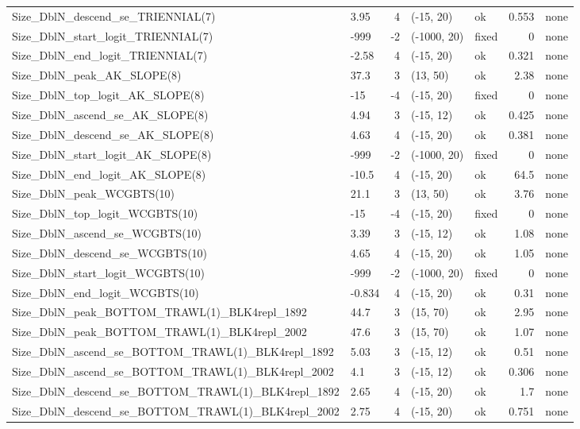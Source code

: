 \documentclass[
]{scrartcl}
\begin{document}
\begin{longtable}{llrllrl}
Size\_DblN\_descend\_se\_TRIENNIAL(7) & 3.95 & 4 & (-15, 20) & ok & 0.553 & none \\ 
Size\_DblN\_start\_logit\_TRIENNIAL(7) & -999 & -2 & (-1000, 20) & fixed & 0 & none \\ 
Size\_DblN\_end\_logit\_TRIENNIAL(7) & -2.58 & 4 & (-15, 20) & ok & 0.321 & none \\ 
Size\_DblN\_peak\_AK\_SLOPE(8) & 37.3 & 3 & (13, 50) & ok & 2.38 & none \\ 
Size\_DblN\_top\_logit\_AK\_SLOPE(8) & -15 & -4 & (-15, 20) & fixed & 0 & none \\ 
Size\_DblN\_ascend\_se\_AK\_SLOPE(8) & 4.94 & 3 & (-15, 12) & ok & 0.425 & none \\ 
Size\_DblN\_descend\_se\_AK\_SLOPE(8) & 4.63 & 4 & (-15, 20) & ok & 0.381 & none \\ 
Size\_DblN\_start\_logit\_AK\_SLOPE(8) & -999 & -2 & (-1000, 20) & fixed & 0 & none \\ 
Size\_DblN\_end\_logit\_AK\_SLOPE(8) & -10.5 & 4 & (-15, 20) & ok & 64.5 & none \\ 
Size\_DblN\_peak\_WCGBTS(10) & 21.1 & 3 & (13, 50) & ok & 3.76 & none \\ 
Size\_DblN\_top\_logit\_WCGBTS(10) & -15 & -4 & (-15, 20) & fixed & 0 & none \\ 
Size\_DblN\_ascend\_se\_WCGBTS(10) & 3.39 & 3 & (-15, 12) & ok & 1.08 & none \\ 
Size\_DblN\_descend\_se\_WCGBTS(10) & 4.65 & 4 & (-15, 20) & ok & 1.05 & none \\ 
Size\_DblN\_start\_logit\_WCGBTS(10) & -999 & -2 & (-1000, 20) & fixed & 0 & none \\ 
Size\_DblN\_end\_logit\_WCGBTS(10) & -0.834 & 4 & (-15, 20) & ok & 0.31 & none \\ 
Size\_DblN\_peak\_BOTTOM\_TRAWL(1)\_BLK4repl\_1892 & 44.7 & 3 & (15, 70) & ok & 2.95 & none \\ 
Size\_DblN\_peak\_BOTTOM\_TRAWL(1)\_BLK4repl\_2002 & 47.6 & 3 & (15, 70) & ok & 1.07 & none \\ 
Size\_DblN\_ascend\_se\_BOTTOM\_TRAWL(1)\_BLK4repl\_1892 & 5.03 & 3 & (-15, 12) & ok & 0.51 & none \\ 
Size\_DblN\_ascend\_se\_BOTTOM\_TRAWL(1)\_BLK4repl\_2002 & 4.1 & 3 & (-15, 12) & ok & 0.306 & none \\ 
Size\_DblN\_descend\_se\_BOTTOM\_TRAWL(1)\_BLK4repl\_1892 & 2.65 & 4 & (-15, 20) & ok & 1.7 & none \\ 
Size\_DblN\_descend\_se\_BOTTOM\_TRAWL(1)\_BLK4repl\_2002 & 2.75 & 4 & (-15, 20) & ok & 0.751 & none \\ 

\end{longtable}
\end{document}
